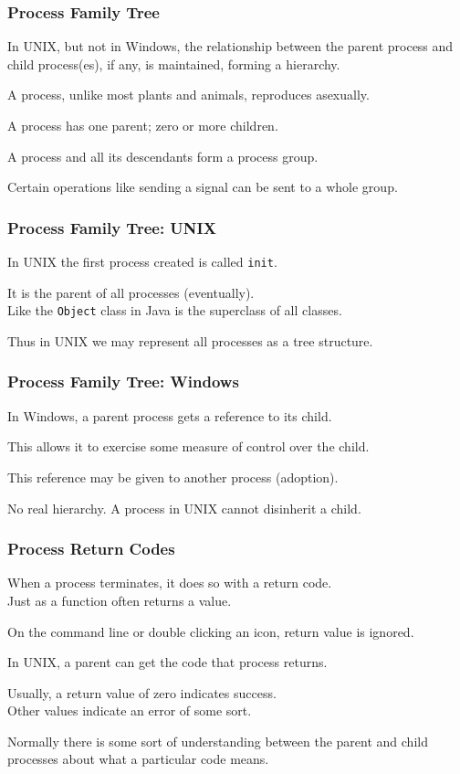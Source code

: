 \begin{frame}
	\frametitle{Process Family Tree}
	In UNIX, but not in Windows, the relationship between the parent process and child process(es), if any, is maintained, forming a hierarchy.

	A process, unlike most plants and animals, reproduces asexually.

	A process has one parent; zero or more children.

	A process and all its descendants form a \alert{process group}.

	Certain operations like sending a signal can be sent to a whole group.

\end{frame}

\begin{frame}
	\frametitle{Process Family Tree: UNIX}
	In UNIX the first process created is called \texttt{init}.

	It is the parent of all processes (eventually).\\
	\quad Like the \texttt{Object} class in Java is the superclass of all classes.

	Thus in UNIX we may represent all processes as a tree structure.

\end{frame}

\begin{frame}
	\frametitle{Process Family Tree: Windows}

	In Windows, a parent process gets a reference to its child.

	This allows it to exercise some measure of control over the child.

	This reference may be given to another process (adoption).

	No real hierarchy. A process in UNIX cannot disinherit a child.


\end{frame}

\begin{frame}
	\frametitle{Process Return Codes}

	When a process terminates, it does so with a return code.\\
	\quad  Just as a function often returns a value.

	On the command line or double clicking an icon, return value is ignored.

	In UNIX, a parent can get the code that process returns.

	Usually, a return value of zero indicates success.\\
	\quad Other values indicate an error of some sort.

	Normally there is some sort of understanding between the parent and child processes about what a particular code means.

\end{frame}


